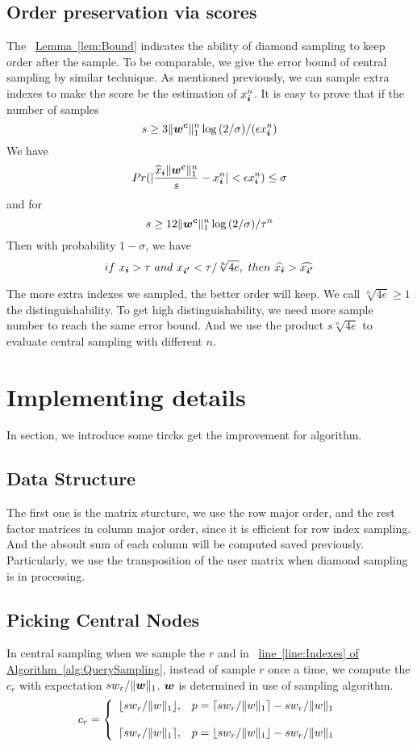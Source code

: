\documentclass[letterpaper]{article}
\newcommand{\V}[1]{{\bm{{\MakeLowercase{#1}}}}}
\newcommand{\norm}[2]{\|#1\|_{#2}}
\newcommand{\Lem}[1] {\hyperref[lem:#1] {Lemma~\ref*{lem:#1}}} %
\newcommand{\AlgLine}[2]{\hyperref[alg:#1]{line~\ref*{line:#2} of Algorithm~\ref*{alg:#1}}}
\begin{document}
\subsection{Order preservation via scores}

The ~\Lem{Bound} indicates the ability of diamond sampling to keep order after the sample. To be comparable, we give the error bound of central sampling by similar technique.
As mentioned previously, we can sample extra indexes to make the score be the estimation of $x^n_{\V{i}}$. It is easy to prove that if the number of samples
\[
s \geq 3\norm{\V{w^c}}{1}^n\log{(2/\sigma)}/(\epsilon x^n_{\V{i}})
\]
We have
\[
Pr(|\frac{\widehat{x}_\V{i}\norm{\V{w^c}}{1}^n}{s} - x^n_{\V{i}}| < \epsilon x^n_{\V{i}}) \leq \sigma
\]
and for
\[
    s \geq 12\norm{\V{w^c}}{1}^n\log{(2/\sigma)}/\tau^n
\]
Then with probability $1-\sigma$, we have
\[
if\ x_{\V{i}} > \tau\ and \ x_{\V{i'}} < \tau/\sqrt[n]{4e}, \ then\ \widehat{x_{\V{i}}} > \widehat{x_{\V{i'}}}
\]

The more extra indexes we sampled, the better order will keep. We call $\sqrt[n]{4e}\geq 1$ the distinguishability. To get high distinguishability, we need more sample number to reach the same error bound. And we use the product $s\sqrt[n]{4e}$ to evaluate central sampling with different $n$.
\section{Implementing details}
In section, we introduce some tircks get the improvement for algorithm.

\subsection{Data Structure}
The first one is the matrix sturcture, we use the row major order, and the rest factor matrices in column major order, since it is efficient for row index sampling. And the absoult sum of each column  will be computed saved previously. Particularly, we use the transposition of the user matrix when diamond sampling is in processing.

\subsection{Picking Central Nodes}
In central sampling when we sample the $r$ and in ~\AlgLine{QuerySampling}{Indexes}, instead of sample $r$ once a time, we compute the $c_r$ with expectation $sw_r/\norm{\V{w}}{1}$. $\V{w}$ is determined in use of sampling algorithm.
\begin{equation*}c_r=
    \left\{
      \begin{array}{ll}
        \lfloor sw_r/\norm{w}{1} \rfloor,
        & \hbox{$p=\lceil sw_r/\norm{w}{1} \rceil - sw_r/\norm{w}{1}$} \\\\
        \lceil sw_r/\norm{w}{1} \rceil,
        & \hbox{$p=\lfloor sw_r/\norm{w}{1} \rfloor - sw_r/\norm{w}{1}$}
      \end{array}
    \right.
\end{equation*}
\end{document}
